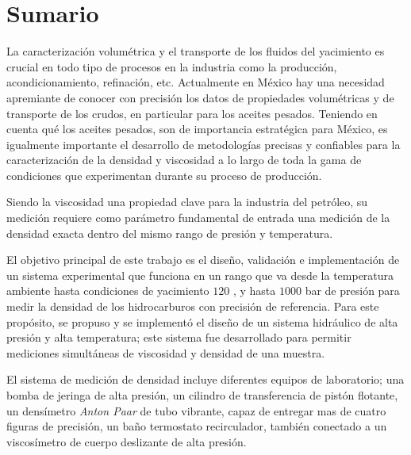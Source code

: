 \vfill

\chapter*{Sumario}

La caracterización volumétrica y el transporte de los fluidos del yacimiento es crucial en todo tipo de procesos en la industria como la producción, acondicionamiento, refinación, etc. Actualmente en México hay una necesidad apremiante de conocer con precisión los datos de propiedades volumétricas y de transporte de los crudos, en particular para los aceites pesados. Teniendo en cuenta qué los aceites pesados, son de importancia estratégica para México, es igualmente importante el desarrollo de metodologías precisas y confiables para la caracterización de la densidad y viscosidad a lo largo de toda la gama de condiciones que experimentan durante su proceso de producción.

Siendo la viscosidad una propiedad clave para la industria del petróleo, su medición requiere como parámetro fundamental de entrada una medición de la densidad exacta dentro del mismo rango de presión y temperatura.

El objetivo principal de este trabajo es el diseño, validación e implementación de un sistema experimental que funciona en un rango que va desde la temperatura ambiente hasta condiciones de yacimiento $ 120 $ \celsius, y hasta $ 1000 $ bar de presión para medir la densidad de los hidrocarburos con precisión de referencia. Para este propósito, se propuso y se implementó el diseño de un sistema hidráulico de alta presión y alta temperatura; este sistema fue desarrollado para permitir mediciones simultáneas de viscosidad y densidad de una muestra.

El sistema de medición de densidad incluye diferentes equipos de laboratorio; una bomba de jeringa de alta presión, un cilindro de transferencia de pistón flotante, un densímetro \emph{Anton Paar} de tubo vibrante, capaz de entregar mas de cuatro figuras de precisión, un baño termostato recirculador, también conectado a un viscosímetro de cuerpo deslizante de alta presión.

